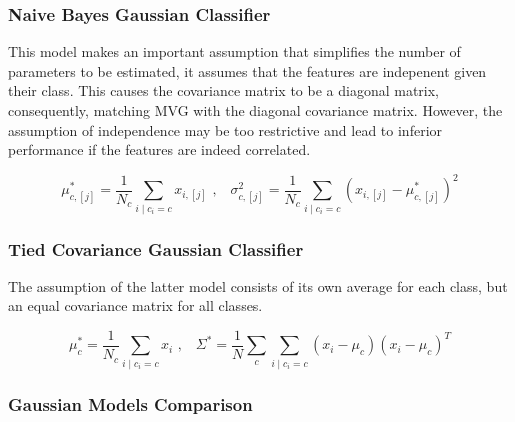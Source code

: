 
\subsubsection{Naive Bayes Gaussian Classifier}
\label{subsubsec:naiveBayesGaussianClassifier}
This model makes an important assumption that simplifies the number of parameters to be estimated,
it assumes that the features are indepenent given their class.
This causes the covariance matrix to be a diagonal matrix, consequently, matching MVG with the diagonal covariance matrix.
However, the assumption of independence may be too restrictive and lead to inferior performance if the features are indeed correlated.

\begin{equation}
    \mu_{c,[j]}^* = \frac{1}{N_c} \sum_{i\mid c_i = c} x_{i,[j]}\text{ ,}\quad
    \sigma_{c,[j]}^2 = \frac{1}{N_c} \sum_{i\mid c_i = c} (x_{i,[j]} - \mu_{c,[j]}^*)^2
    \label{eq:meanAndVarianceNBG}
\end{equation}


\subsubsection{Tied Covariance Gaussian Classifier}
\label{subsubsec:tiedCovarianceGaussianClassifier}
The assumption of the latter model consists of its own average for each class, but an equal covariance matrix for all classes.

\begin{equation}
    \mu_c^* = \frac{1}{N_c} \sum_{i\mid c_i=c} x_i\text{ ,}\quad
    \Sigma^* = \frac{1}{N} \sum_{c} \sum_{i\mid c_i = c} (x_{i} - \mu_c)(x_{i} - \mu_c)^T
    \label{eq:tiedCovariance}
\end{equation}

\subsubsection{Gaussian Models Comparison}
\label{subsubsec:gaussianModelsComparison}
